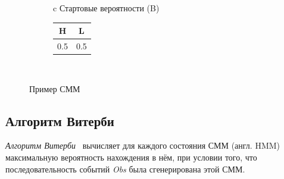 \begin{figure}
\centering
	\begin{subfigure}{\textwidth}
		\centering
	\end{subfigure}
	\newline
	\vspace{1cm}
	\begin{subfigure}{\textwidth}
		\centering
		\begin{tabular}{c}
			Стартовые вероятности (B) \\
			\begin{tabular}{|c|c|}
				\hline
				H & L \\
				\hline
				0.5 & 0.5 \\
				\hline
			\end{tabular} \\
		\end{tabular}
		\vspace{0.3cm}
	\end{subfigure}
\caption{Пример СММ}
\label{fig:HMM}
\end{figure}


\subsection{Алгоритм Витерби}
\label{lab:Viterbi}
\emph{Алгоритм Витерби}~\cite{Viterbi} вычисляет для каждого состояния СММ (англ. HMM) максимальную вероятность нахождения в нём, при условии того, что последовательность событий \emph{Obs} была сгенерирована этой СММ.

